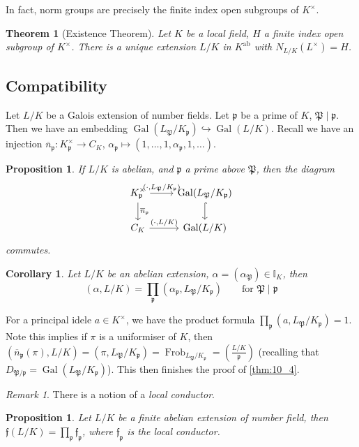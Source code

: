 \documentclass[11pt]{article}
\theoremstyle{definition}
\theoremstyle{plain}
\newtheorem{theorem}[definition]{Theorem}
\newtheorem{proposition}[definition]{Proposition}
\newtheorem{corollary}[definition]{Corollary}
\theoremstyle{remark}
\newtheorem*{remark*}{Remark}
\DeclareMathOperator{\Gal}{Gal}
\DeclareMathOperator{\Frob}{Frob}
\newcommand{\II}{\mathbb{I}}
\newcommand{\cp}{\mathfrak{P}}
\newcommand{\ff}{\mathfrak{f}}
\newcommand{\fp}{\mathfrak{p}}
\newcommand{\leg}[2]{\left(\frac{#1}{#2}\right)}
\newcommand{\ab}{\mathrm{ab}}
\begin{document}
In fact, norm groups are precisely the finite index open subgroups of $K^\times$.
\begin{theorem}[Existence Theorem]
    Let $K$ be a local field, $H$ a finite index open subgroup of $K^\times$. There is a unique extension $L/K$ in $K^\ab$ with $N_{L/K}(L^\times) = H$.
\end{theorem}

\subsection{Compatibility}

Let $L/K$ be a Galois extension of number fields. Let $\fp$ be a prime of $K$, $\cp \mid \fp$. Then we have an embedding $\Gal(L_\cp / K_\fp) \hookrightarrow \Gal(L/K)$. Recall we have an injection $\overline{n}_\fp : K_\fp^\times \to C_K$, $\alpha_\fp \mapsto (1, \ldots, 1, \alpha_\fp, 1, \ldots)$.

\begin{proposition}\label{prop:11_4}
    If $L/K$ is abelian, and $\fp$ a prime above $\cp$, then the diagram
    \begin{equation*}
    \begin{tikzcd}
        K_\fp^\times \arrow[r, "(\cdot{,} L_\cp / K_\fp)"] \arrow[d, "\overline{n}_\fp"] & \Gal(L_\cp / K_\fp) \arrow[d, hookrightarrow]\\
        C_K \arrow[r, "(\cdot{,} L/K)"] & \Gal(L/K)
    \end{tikzcd}
    \end{equation*}
    commutes.
\end{proposition}

\begin{corollary}\label{cor:11_5}
    Let $L/K$ be an abelian extension, $\alpha = (\alpha_\cp) \in \II_K$, then
    \begin{equation*}
        (\alpha, L/K) = \prod_{\fp} (\alpha_\fp, L_\cp / K_\fp) \qquad\text{for } \cp \mid \fp
    \end{equation*}
\end{corollary}
For a principal idele $a \in K^\times$, we have the product formula $\prod_\fp (a, L_\cp / K_\fp) = 1$. Note this implies if $\pi$ is a uniformiser of $K$, then $(\overline{n}_\fp(\pi), L/K) = (\pi, L_\cp / K_\fp) = \Frob_{L_\cp / K_\fp} = \leg{L/K}{\fp}$ (recalling that $D_{\cp/\fp} = \Gal(L_\cp / K_\fp)$). This then finishes the proof of \autoref{thm:10_4}.

\begin{remark*}
    There is a notion of a \emph{local conductor}.
\end{remark*}

\begin{proposition}\label{prop:11_6}
    Let $L/K$ be a finite abelian extension of number field, then $\ff(L/K) = \prod_{\fp} \ff_\fp$, where $\ff_\fp$ is the local conductor.
\end{proposition}
\end{document}
